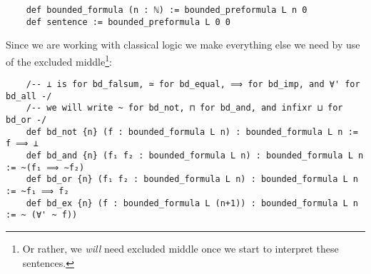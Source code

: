 \begin{dfn}[Formulas]
\begin{lstlisting}
    def bounded_formula (n : ℕ) := bounded_preformula L n 0
    def sentence := bounded_preformula L 0 0\end{lstlisting}

  Since we are working with classical logic we
  make everything else we need by use of the excluded middle\footnote{
    Or rather, we \textit{will} need excluded middle once we start to
    interpret these sentences.
  }:

  \begin{lstlisting}
    /-- ⊥ is for bd_falsum, ≃ for bd_equal, ⟹ for bd_imp, and ∀' for bd_all -/
    /-- we will write ~ for bd_not, ⊓ for bd_and, and infixr ⊔ for bd_or -/
    def bd_not {n} (f : bounded_formula L n) : bounded_formula L n := f ⟹ ⊥
    def bd_and {n} (f₁ f₂ : bounded_formula L n) : bounded_formula L n := ~(f₁ ⟹ ∼f₂)
    def bd_or {n} (f₁ f₂ : bounded_formula L n) : bounded_formula L n := ~f₁ ⟹ f₂
    def bd_ex {n} (f : bounded_formula L (n+1)) : bounded_formula L n := ~ (∀' ~ f))
  \end{lstlisting}
\end{dfn}

